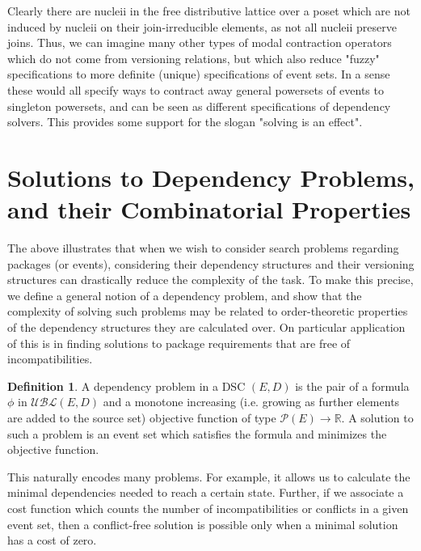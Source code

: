 \documentclass[hoptionsi,review,format=acmsmall]{acmart}
\theoremstyle{definition}
\newtheorem{definition}{Definition}[section]
\newcommand{\UBLc}{\mathcal{UBL}}
\newcommand{\Pc}{\mathcal{P}}
\begin{document}
Clearly there are nucleii in the free distributive lattice over a poset which are not induced by nucleii on their join-irreducible elements, as not all nucleii preserve joins. Thus, we can imagine many other types of modal contraction operators which do not come from versioning relations, but which also reduce "fuzzy" specifications to more definite (unique) specifications of event sets. In  a sense these would all specify ways to contract away general powersets of events to singleton powersets, and can be seen as different specifications of dependency solvers. This provides some support for the slogan "solving is an effect".

\section{Solutions to Dependency Problems, and their Combinatorial Properties}
The above illustrates that when we wish to consider search problems regarding packages (or events), considering their dependency structures and their versioning structures can drastically reduce the complexity of the task. To make this precise, we define a general notion of a dependency problem, and show that the complexity of solving such problems may be related to order-theoretic properties of the dependency structures they are calculated over. On particular application of this is in finding solutions to package requirements that are free of incompatibilities.

\begin{definition}
A dependency problem in a DSC \((E,D)\) is the pair of a formula \(\phi\) in \(\UBLc(E,D)\) and a monotone increasing (i.e. growing as further elements are added to the source set) objective function of type \(\Pc(E) \rightarrow \mathbb{R}\). A solution to such a problem is an event set which satisfies the formula and minimizes the objective function.
\end{definition}

This naturally encodes many problems. For example, it allows us to calculate the minimal dependencies needed to reach a certain state. Further, if we associate a cost function which counts the number of incompatibilities or conflicts in a given event set, then a conflict-free solution is possible only when a minimal solution has a cost of zero.
\end{document}
